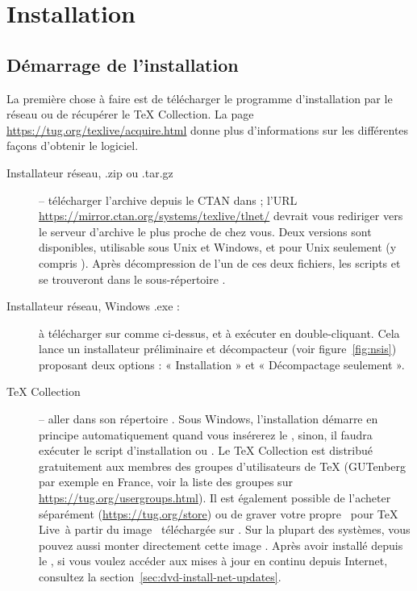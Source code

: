 \documentclass[german, english, french, 12pt]{article}
\renewcommand{\TL}{\TeX{} Live\xspace}%
\renewcommand{\TK}{\TeX{} Collection\xspace}%
\begin{document}
\section{Installation}
\label{sec:install}

\subsection{Démarrage de l'installation}
\label{sec:inst_start}

La première chose à faire est de télécharger le programme d'installation par le
réseau ou de récupérer le \DVD{} \TK.  La page
\url{https://tug.org/texlive/acquire.html} donne plus d'informations sur les
différentes façons d'obtenir le logiciel.

\begin{description}
\item[Installateur réseau, .zip ou .tar.gz] -- télécharger l'archive depuis le
  CTAN dans  ; l'URL
\url{https://mirror.ctan.org/systems/texlive/tlnet/} devrait vous rediriger vers
le serveur d'archive le plus proche de chez vous.  Deux versions sont
disponibles,  utilisable sous Unix et Windows, et
 pour Unix seulement (y compris \macOS). Après
décompression de l'un de ces deux fichiers, les scripts  et
 se trouveront dans le sous-répertoire
.

\item[Installateur réseau, Windows .exe :] à télécharger sur \CTAN{} comme
  ci-dessus, et à exécuter en double-cliquant. Cela lance un installateur
  préliminaire et décompacteur (voir figure~\ref{fig:nsis}) proposant deux
  options : « Installation » et « Décompactage seulement ».

\item[\DVD \TK{}] -- aller dans son répertoire .  Sous Windows,
  l'installation démarre en principe automatiquement quand vous insérerez le
  \DVD, sinon, il faudra exécuter le script d'installation 
  ou .  Le \DVD \TK{} est distribué gratuitement aux
  membres des groupes d'utilisateurs de \TeX{} (GUTenberg par exemple en France,
  voir la liste des groupes sur \url{https://tug.org/usergroups.html}). Il est
  également possible de l'acheter séparément (\url{https://tug.org/store}) ou de
  graver votre propre \DVD\ pour \TL\ à partir du image \ISO\ téléchargée sur
  \CTAN. Sur la plupart des systèmes, vous pouvez aussi monter directement cette
  image \ISO.  Après avoir installé depuis le \DVD{}, si vous voulez accéder aux
  mises à jour en continu depuis Internet, consultez la
  section~\ref{sec:dvd-install-net-updates}.
\end{description}
\end{document}
